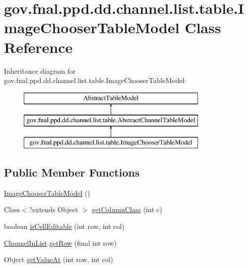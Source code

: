 \hypertarget{classgov_1_1fnal_1_1ppd_1_1dd_1_1channel_1_1list_1_1table_1_1ImageChooserTableModel}{\section{gov.\-fnal.\-ppd.\-dd.\-channel.\-list.\-table.\-Image\-Chooser\-Table\-Model Class Reference}
\label{classgov_1_1fnal_1_1ppd_1_1dd_1_1channel_1_1list_1_1table_1_1ImageChooserTableModel}
}
Inheritance diagram for gov.\-fnal.\-ppd.\-dd.\-channel.\-list.\-table.\-Image\-Chooser\-Table\-Model\-:\begin{figure}[H]
\begin{center}
\leavevmode
\includegraphics[height=3.000000cm]{classgov_1_1fnal_1_1ppd_1_1dd_1_1channel_1_1list_1_1table_1_1ImageChooserTableModel}
\end{center}
\end{figure}
\subsection*{Public Member Functions}
\begin{DoxyCompactItemize}
\item 
\hyperlink{classgov_1_1fnal_1_1ppd_1_1dd_1_1channel_1_1list_1_1table_1_1ImageChooserTableModel_afe0aba308507de2be933030226aab492}{Image\-Chooser\-Table\-Model} ()
\item 
Class$<$?extends Object $>$ \hyperlink{classgov_1_1fnal_1_1ppd_1_1dd_1_1channel_1_1list_1_1table_1_1ImageChooserTableModel_a8b7164eb617a21eb497f184c3acd1950}{get\-Column\-Class} (int c)
\item 
boolean \hyperlink{classgov_1_1fnal_1_1ppd_1_1dd_1_1channel_1_1list_1_1table_1_1ImageChooserTableModel_ac9c6c92a598cb666edd2e6bc572a0c72}{is\-Cell\-Editable} (int row, int col)
\item 
\hyperlink{interfacegov_1_1fnal_1_1ppd_1_1dd_1_1channel_1_1ChannelInList}{Channel\-In\-List} \hyperlink{classgov_1_1fnal_1_1ppd_1_1dd_1_1channel_1_1list_1_1table_1_1ImageChooserTableModel_a00da5535ef51a9e172a596176dfbc48e}{get\-Row} (final int row)
\item 
Object \hyperlink{classgov_1_1fnal_1_1ppd_1_1dd_1_1channel_1_1list_1_1table_1_1ImageChooserTableModel_a4cc66bad16ee719c0162a2497820b0ab}{get\-Value\-At} (int row, int col)
\end{DoxyCompactItemize}
